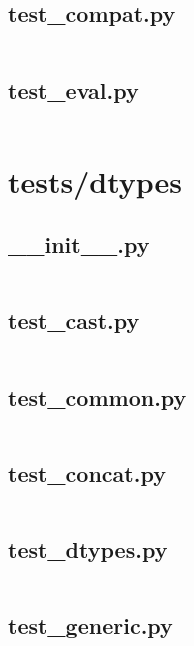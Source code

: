 \documentclass{article}
\begin{document}
\subsection{test\_compat.py}
\inputminted{python}{/home/dufferzafar/dev/@clones/pandas/pandas/tests/computation/test_compat.py}
\newpage

\subsection{test\_eval.py}
\inputminted{python}{/home/dufferzafar/dev/@clones/pandas/pandas/tests/computation/test_eval.py}
\newpage

\section{tests/dtypes}

\subsection{\_\_init\_\_.py}
\inputminted{python}{/home/dufferzafar/dev/@clones/pandas/pandas/tests/dtypes/__init__.py}
\newpage

\subsection{test\_cast.py}
\inputminted{python}{/home/dufferzafar/dev/@clones/pandas/pandas/tests/dtypes/test_cast.py}
\newpage

\subsection{test\_common.py}
\inputminted{python}{/home/dufferzafar/dev/@clones/pandas/pandas/tests/dtypes/test_common.py}
\newpage

\subsection{test\_concat.py}
\inputminted{python}{/home/dufferzafar/dev/@clones/pandas/pandas/tests/dtypes/test_concat.py}
\newpage

\subsection{test\_dtypes.py}
\inputminted{python}{/home/dufferzafar/dev/@clones/pandas/pandas/tests/dtypes/test_dtypes.py}
\newpage

\subsection{test\_generic.py}
\inputminted{python}{/home/dufferzafar/dev/@clones/pandas/pandas/tests/dtypes/test_generic.py}
\newpage
\end{document}
